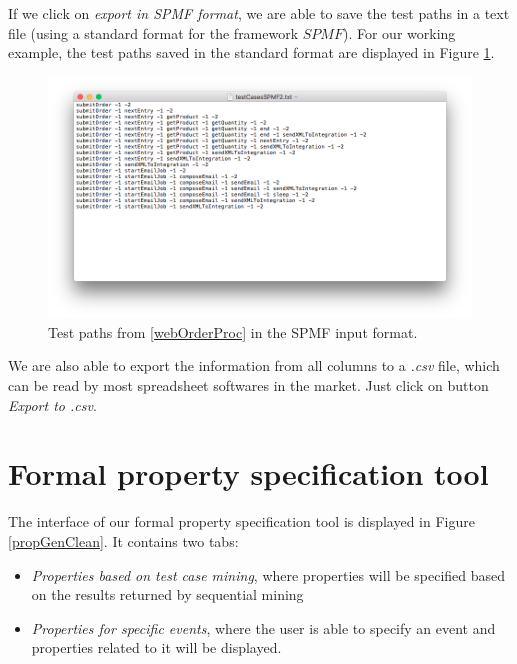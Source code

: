 If we click on \textit{export in SPMF format}, we are able to save the test paths in a text file (using a standard format for the framework $SPMF$). For our working example, the test paths saved in the standard format are displayed in Figure \ref{resultsSPMFFile}.

\begin{figure}[htb]
\centering
\includegraphics[width=\textwidth]{figuras/resultsSPMFFile}
\caption{\label{resultsSPMFFile} Test paths from \ref{webOrderProc} in the SPMF input format.}
\end{figure}

We are also able to export the information from all columns to a \textit{.csv} file, which can be read by most spreadsheet softwares in the market. Just click on button \textit{Export to .csv}.



\section{Formal property specification tool}

The interface of our formal property specification tool is displayed in Figure \ref{propGenClean}. It contains two tabs: 
\begin{itemize}
\item \textit{Properties based on test case mining}, where properties will be specified based on the results returned by sequential mining
\item \textit{Properties for specific events}, where the user is able to specify an event and properties related to it will be displayed.
\end{itemize}


